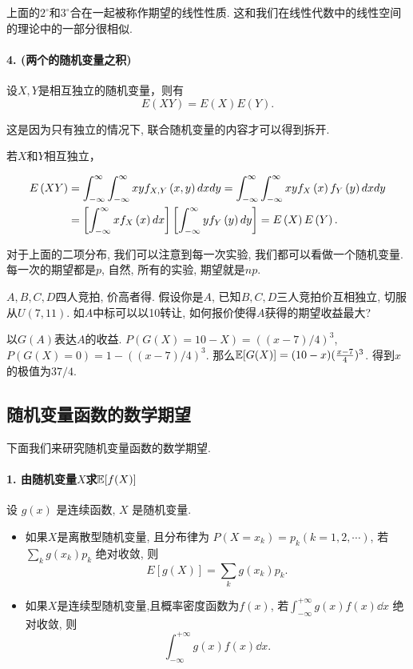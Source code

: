     上面的$2^\circ$和$3^\circ$合在一起被称作期望的线性性质. 这和我们在线性代数中的线性空间的理论中的一部分很相似. 

    \paragraph{4. (两个的随机变量之积)} 设$X,Y$是相互独立的随机变量，则有\[
        E\left(XY\right) = E\left(X\right)E\left(Y\right).
    \]



    这是因为只有独立的情况下, 联合随机变量的内容才可以得到拆开. 

    若$X$和$Y$相互独立，
        
        \begin{align}
            E\left(XY\right) &= \int_{-\infty}^{\infty}\int_{-\infty}^{\infty}xyf_{X,Y}\left(x,y\right){d}x{d}y = \int_{-\infty}^{\infty}\int_{-\infty}^{\infty}xyf_X\left(x\right)f_Y\left(y\right){d}x{d}y\notag\\
            & = \left[\int_{-\infty}^{\infty}xf_X\left(x\right){d}x\right]\left[\int_{-\infty}^{\infty}yf_Y\left(y\right){d}y\right] = E\left(X\right)E\left(Y\right).\notag
        \end{align}

    对于上面的二项分布, 我们可以注意到每一次实验, 我们都可以看做一个随机变量. 每一次的期望都是$p$, 自然, 所有的实验, 期望就是$np$. 

    \begin{exercise}
        $A, B, C, D$四人竞拍, 价高者得. 假设你是$A$, 已知$B, C, D$三人竞拍价互相独立, 切服从$U(7,11)$. 如$A$中标可以以10转让, 如何报价使得$A$获得的期望收益最大?
    \end{exercise}

    \begin{solution}
        以$G(A)$表达$A$的收益. $P(G(X)=10-X)=((x-7)/4)^3$, $P(G(X)=0)=1-((x-7)/4)^3$. 那么$\mathbb E[G(X)]=(10-x)(\frac{x-7} 4)^3$. 得到$x$的极值为$37/4$. 
    \end{solution}
    


    \subsection{随机变量函数的数学期望}
    下面我们来研究随机变量函数的数学期望. 

    \paragraph{1. 由随机变量$X$求$\mathbb E[f(X)]$} 设 $g(x)$ 是连续函数, $X$ 是随机变量.
    \begin{itemize}
        \item 如果$X$是离散型随机变量, 且分布律为 $P\left(X=x_k\right)=p_k(k=1,2, \cdots)$, 若 $\sum_k g\left(x_k\right) p_k$ 绝对收敛, 则
        $$
        E[g(X)]=\sum_k g\left(x_k\right) p_k .
        $$
        \item 如果$X$是连续型随机变量,且概率密度函数为$f(x)$, 若$\int_{-\infty}^{+\infty} g(x)f(x)\dd x$ 绝对收敛, 则
        $$\int_{-\infty}^{+\infty} g(x)f(x)\dd x.$$
    \end{itemize}
    
